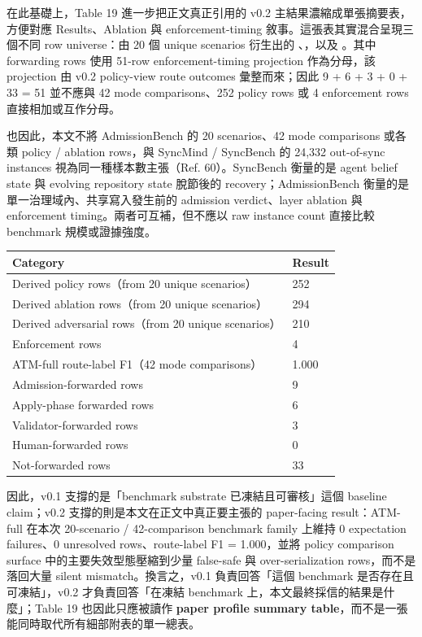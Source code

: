 \documentclass[a4paper,fontset=none]{ctexart}
\begin{document}
在此基礎上，Table 19 進一步把正文真正引用的 v0.2 主結果濃縮成單張摘要表，方便對應 Results、Ablation 與 enforcement-timing 敘事。這張表其實混合呈現三個不同 row universe：由 20 個 unique scenarios 衍生出的 \texttt{}、\texttt{}，以及 \texttt{}。其中 forwarding rows 使用 51-row enforcement-timing projection 作為分母，該 projection 由 v0.2 policy-view route outcomes 彙整而來；因此 9 + 6 + 3 + 0 + 33 = 51 並不應與 42 mode comparisons、252 policy rows 或 4 enforcement rows 直接相加或互作分母。

也因此，本文不將 AdmissionBench 的 20 scenarios、42 mode comparisons 或各類 policy / ablation rows，與 SyncMind / SyncBench 的 24,332 out-of-sync instances 視為同一種樣本數主張（Ref. 60）。SyncBench 衡量的是 agent belief state 與 evolving repository state 脫節後的 recovery；AdmissionBench 衡量的是單一治理域內、共享寫入發生前的 admission verdict、layer ablation 與 enforcement timing。兩者可互補，但不應以 raw instance count 直接比較 benchmark 規模或證據強度。

\smallskip{}\par\smallskip

\begingroup
\footnotesize
{}
\begin{longtable}{L{0.28\textwidth}L{0.28\textwidth}}
\toprule
Category & Result \\
\midrule
Derived policy rows（from 20 unique scenarios） & 252 \\
Derived ablation rows（from 20 unique scenarios） & 294 \\
Derived adversarial rows（from 20 unique scenarios） & 210 \\
Enforcement rows & 4 \\
ATM-full route-label F1（42 mode comparisons） & 1.000 \\
Admission-forwarded rows & 9 \\
Apply-phase forwarded rows & 6 \\
Validator-forwarded rows & 3 \\
Human-forwarded rows & 0 \\
Not-forwarded rows & 33 \\
\bottomrule
\end{longtable}
\endgroup

因此，v0.1 支撐的是「benchmark substrate 已凍結且可審核」這個 baseline claim；v0.2 支撐的則是本文在正文中真正要主張的 paper-facing result：ATM-full 在本次 20-scenario / 42-comparison benchmark family 上維持 0 expectation failures、0 unresolved rows、route-label F1 = 1.000，並將 policy comparison surface 中的主要失效型態壓縮到少量 false-safe 與 over-serialization rows，而不是落回大量 silent mismatch。換言之，v0.1 負責回答「這個 benchmark 是否存在且可凍結」，v0.2 才負責回答「在凍結 benchmark 上，本文最終採信的結果是什麼」；Table 19 也因此只應被讀作 \textbf{paper profile summary table}，而不是一張能同時取代所有細部附表的單一總表。
\end{document}
